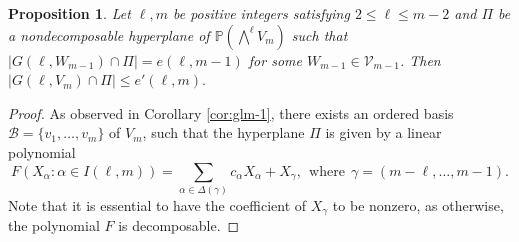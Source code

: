 \documentclass[10pt,a4paper,oneside]{amsproc}
\newtheorem{proposition}[theorem]{Proposition}
\newcommand{\B}{\mathcal{B}}
\def\a{{\alpha}}
\def\PP{{\mathbb P}}
\newcommand{\V}{{\mathcal{V}}}
\begin{document}
\begin{proposition}\label{submax}
    Let $\ell, m$ be positive integers satisfying $2 \le \ell \le m-2$ and $\Pi$ be a nondecomposable hyperplane of $\PP\left(\bigwedge^\ell V_m\right)$ such that $|G(\ell, W_{m-1}) \cap \Pi|= e(\ell, m-1)$ for some  $W_{m-1} \in \V_{m-1}$. Then $|G(\ell, V_m) \cap \Pi| \le e' (\ell, m).$
\end{proposition}

\begin{proof}
    As observed in Corollary \ref{cor:glm-1}, there exists an ordered basis $\B = \{v_1, \dots, v_m\}$ of $V_m$, such that the hyperplane $\Pi$ is given by a linear polynomial $$F(X_\a : \a \in I(\ell, m)) = \sum_{\a \in \Delta (\gamma)} c_\a X_\a + X_\gamma, \ \ \text{where} \ \ \gamma = (m-\ell, \dots, m-1).$$ Note that it is essential to have the coefficient of $X_\gamma$ to be nonzero, as otherwise, the polynomial $F$ is decomposable. 
    

\end{proof}
\end{document}
